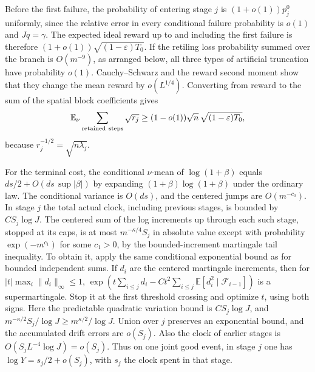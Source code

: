 \documentclass[11pt]{article}
\newcommand{\1}{\mathbf{1}}
\numberwithin{equation}{section}
\newcommand{\E}{\mathbb E}
\begin{document}
Before the first failure, the probability of entering stage
\(j\) is \((1+o(1))p_j^0\) uniformly, since the relative error
in every conditional failure probability is \(o(1)\) and
\(Jq=\gamma\). The expected ideal reward up to and including
the first failure is therefore
\((1+o(1))\sqrt{(1-\varepsilon)T_0}\).
If the retiling loss probability summed over the branch
is \(O(m^{-9})\), as arranged below, all three types of
artificial truncation have probability \(o(1)\).
Cauchy--Schwarz and the reward second moment show that they
change the mean reward by \(o(L^{1/4})\). Converting from
reward to the sum of the spatial block coefficients gives
\begin{equation}\label{eq:state-reward-sharp}
 \E_\nu\sum_{\rm retained\ steps}\sqrt{r_j}
 \ge (1-o(1))\sqrt n\,\sqrt{(1-\varepsilon)T_0},
\end{equation}
because \(r_j^{-1/2}=\sqrt{n\lambda_j}\).

For the terminal cost, the conditional \(\nu\)-mean of
\(\log(1+\beta)\) equals \(ds/2+O(ds\,\sup|\beta|)\)
by expanding \((1+\beta)\log(1+\beta)\) under the ordinary
law. The conditional variance is \(O(ds)\), and the
centered jumps are \(O(m^{-c_0})\). In stage \(j\) the
total actual clock, including previous stages, is bounded
by \(C S_j\log J\). The centered sum of the log increments
up through each such stage, stopped at its caps, is at most
\(m^{-\kappa/4}S_j\) in absolute value except with probability
\(\exp(-m^{c_1})\) for some \(c_1>0\), by the bounded-increment
martingale tail inequality. To obtain it, apply the same
conditional exponential bound as for bounded independent sums.
If \(d_i\) are the centered martingale increments, then for
\(|t|\max_i\|d_i\|_\infty\le1\),
\(\exp(t\sum_{i\le j}d_i-Ct^2\sum_{i\le j}
\E[d_i^2\mid\mathcal F_{i-1}])\) is a supermartingale.
Stop it at the first threshold crossing and optimize \(t\),
using both signs. Here the predictable quadratic variation
bound is \(C S_j\log J\), and
\(m^{-\kappa/2}S_j/\log J\ge m^{\kappa/2}/\log J\).
Union over \(j\) preserves an exponential bound, and the
accumulated drift errors are \(o(S_j)\). Also the clock of
earlier stages is \(O(S_j L^{-4}\log J)=o(S_j)\).
Thus on one joint good event, in stage \(j\) one has
\(\log Y=s_j/2+o(S_j)\), with \(s_j\) the clock spent in
that stage.
\end{document}
